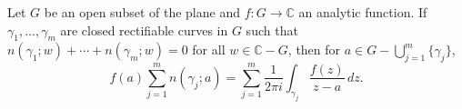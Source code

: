 Let $G$ be an open subset of the plane and $f: G \to \mathbb{C}$ an analytic function. If $\gamma_1, \ldots, \gamma_m$ are closed rectifiable curves in $G$ such that $n(\gamma_1; w) + \cdots + n(\gamma_m; w) = 0$ for all $w \in \mathbb{C} - G$, then for $a \in G - \bigcup_{j=1}^{m} \{\gamma_j\}$,
$$
f(a) \sum_{j=1}^{m} n(\gamma_j; a) = \sum_{j=1}^{m} \frac{1}{2\pi i} \int_{\gamma_j} \frac{f(z)}{z - a} \, dz.
$$
